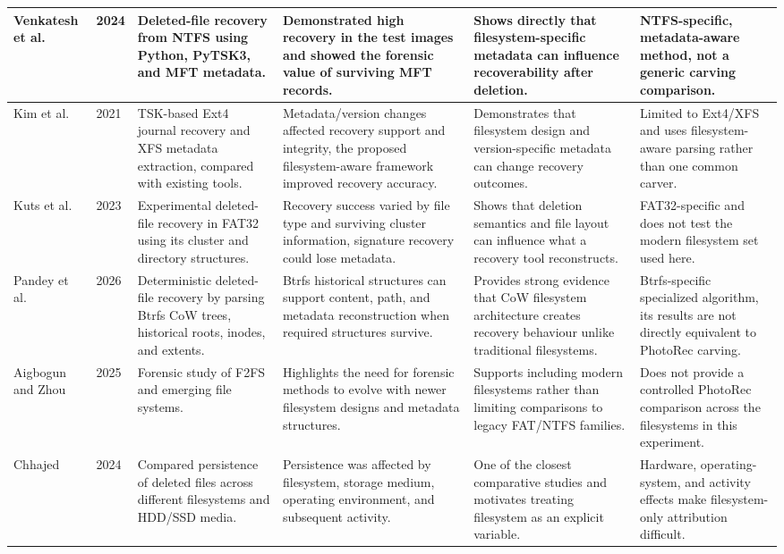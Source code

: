 \documentclass[conference]{IEEEtran}
\begin{document}
\begin{table}[t]
\begin{tabularx}{\textwidth}{|p{2.15cm}|C{0.65cm}|>{\raggedright\arraybackslash}X|>{\raggedright\arraybackslash}X|>{\raggedright\arraybackslash}X|>{\raggedright\arraybackslash}X|}
\hline
Venkatesh et al. \cite{venkatesh2024ntfs} & 2024 & Deleted-file recovery from NTFS using Python, PyTSK3, and MFT metadata. & Demonstrated high recovery in the test images and showed the forensic value of surviving MFT records. & Shows directly that filesystem-specific metadata can influence recoverability after deletion. & NTFS-specific, metadata-aware method, not a generic carving comparison. \\
\hline
Kim et al. \cite{kim2021ext4xfs} & 2021 & TSK-based Ext4 journal recovery and XFS metadata extraction, compared with existing tools. & Metadata/version changes affected recovery support and integrity, the proposed filesystem-aware framework improved recovery accuracy. & Demonstrates that filesystem design and version-specific metadata can change recovery outcomes. & Limited to Ext4/XFS and uses filesystem-aware parsing rather than one common carver. \\
\hline
Kuts et al. \cite{kuts2023fat32} & 2023 & Experimental deleted-file recovery in FAT32 using its cluster and directory structures. & Recovery success varied by file type and surviving cluster information, signature recovery could lose metadata. & Shows that deletion semantics and file layout can influence what a recovery tool reconstructs. & FAT32-specific and does not test the modern filesystem set used here. \\
\hline
Pandey et al. \cite{pandey2026btrfs} & 2026 & Deterministic deleted-file recovery by parsing Btrfs CoW trees, historical roots, inodes, and extents. & Btrfs historical structures can support content, path, and metadata reconstruction when required structures survive. & Provides strong evidence that CoW filesystem architecture creates recovery behaviour unlike traditional filesystems. & Btrfs-specific specialized algorithm, its results are not directly equivalent to PhotoRec carving. \\
\hline
Aigbogun and Zhou \cite{aigbogun2025f2fs} & 2025 & Forensic study of F2FS and emerging file systems. & Highlights the need for forensic methods to evolve with newer filesystem designs and metadata structures. & Supports including modern filesystems rather than limiting comparisons to legacy FAT/NTFS families. & Does not provide a controlled PhotoRec comparison across the filesystems in this experiment. \\
\hline
Chhajed \cite{chhajed2024persistence} & 2024 & Compared persistence of deleted files across different filesystems and HDD/SSD media. & Persistence was affected by filesystem, storage medium, operating environment, and subsequent activity. & One of the closest comparative studies and motivates treating filesystem as an explicit variable. & Hardware, operating-system, and activity effects make filesystem-only attribution difficult. \\

\end{tabularx}
\end{table}
\end{document}
